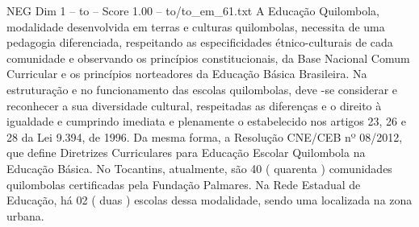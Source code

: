 \begin{textsample}{NEG Dim 1 – to – Score 1.00 – to/to\_em\_61.txt}  \label{ex:f1_neg_031}
A Educação Quilombola, modalidade desenvolvida em terras e culturas quilombolas, necessita de uma pedagogia diferenciada, respeitando as especificidades étnico-culturais de cada comunidade e observando os princípios constitucionais, da Base Nacional Comum Curricular e os princípios norteadores da Educação Básica Brasileira.
Na estruturação e no funcionamento das escolas quilombolas, deve -se considerar e reconhecer a sua diversidade cultural, respeitadas as diferenças e o direito à igualdade e cumprindo imediata e plenamente o estabelecido nos artigos 23, 26 e 28 da Lei 9.394, de 1996.
Da mesma forma, a Resolução CNE/CEB nº 08/2012, que define Diretrizes Curriculares para Educação Escolar Quilombola na Educação Básica.
No Tocantins, atualmente, são 40 ( quarenta ) comunidades quilombolas certificadas pela Fundação Palmares.
Na Rede Estadual de Educação, há 02 ( duas ) escolas dessa modalidade, sendo uma localizada na zona urbana.

\end{textsample}
